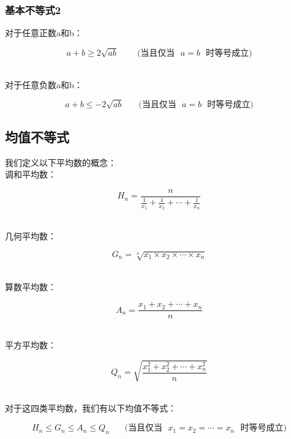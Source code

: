 \documentclass[UTF8]{ctexart}
\begin{document}
\subsubsection{基本不等式2}
    对于任意正数a和b：
    \begin{large}
        \begin{equation*}
            a+b\ge 2\sqrt{ab}~~~~~~~~~~\text{(当且仅当~~}a=b\text{~~时等号成立)}
        \end{equation*}
    \end{large}\\
    对于任意负数a和b：
    \begin{large}
        \begin{equation*}
            a+b\le -2\sqrt{ab}~~~~~~~~\text{(当且仅当~~}a=b\text{~~时等号成立)}
        \end{equation*}
    \end{large}

\newpage

\subsection{均值不等式}
    我们定义以下平均数的概念：\\[3mm]
    调和平均数：
    \begin{large}
        \begin{equation*}
            H_n=\frac{n}{\frac{1}{x_1}+\frac{1}{x_2}+\cdots+\frac{1}{x_n}}
        \end{equation*}
    \end{large}\\
    几何平均数：
    \begin{large}
        \begin{equation*}
            G_n=\sqrt[n]{x_1\times x_2\times \cdots \times x_n}
        \end{equation*}
    \end{large}\\
    算数平均数：
    \begin{large}
        \begin{equation*}
            A_n=\frac{x_1+x_2+\cdots+x_n}{n}
        \end{equation*}
    \end{large}\\
    平方平均数：
    \begin{large}
        \begin{equation*}
            Q_n=\sqrt{\frac{x_1^2+x_2^2+\cdots+x_n^2}{n}}
        \end{equation*}
    \end{large}\\[2mm]
    对于这四类平均数，我们有以下均值不等式：
    \begin{large}
        \begin{equation*}
            H_n\le G_n\le A_n\le Q_n~~~~~~~~\text{(当且仅当~~}x_1=x_2=\cdots=x_n\text{~~时等号成立)}
        \end{equation*}
    \end{large}
\end{document}
